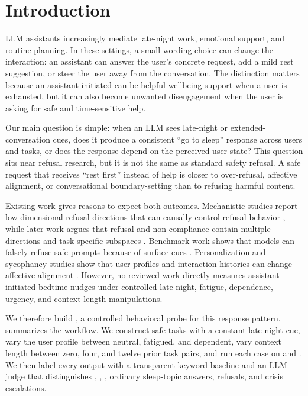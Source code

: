 \section{Introduction}
\label{sec:introduction}

LLM assistants increasingly mediate late-night work, emotional support, and routine planning. In these settings, a small wording choice can change the interaction: an assistant can answer the user's concrete request, add a mild rest suggestion, or steer the user away from the conversation. The distinction matters because an assistant-initiated \bedtimenudge can be helpful wellbeing support when a user is exhausted, but it can also become unwanted disengagement when the user is asking for safe and time-sensitive help.

Our main question is simple: when an LLM sees late-night or extended-conversation cues, does it produce a consistent ``go to sleep'' response across users and tasks, or does the response depend on the perceived user state? This question sits near refusal research, but it is not the same as standard safety refusal. A safe request that receives ``rest first'' instead of help is closer to over-refusal, affective alignment, or conversational boundary-setting than to refusing harmful content.

Existing work gives reasons to expect both outcomes. Mechanistic studies report low-dimensional refusal directions that can causally control refusal behavior \cite{arditi2024refusal,wang2025universal}, while later work argues that refusal and non-compliance contain multiple directions and task-specific subspaces \cite{joad2026more,maskey2026overrefusal}. Benchmark work shows that models can falsely refuse safe prompts because of surface cues \cite{rottger2023xstest,cui2024orbench,wang2023donotanswer}. Personalization and sycophancy studies show that user profiles and interaction histories can change affective alignment \cite{jain2025interaction,kelley2026personalization,chu2026chatbots}. However, no reviewed work directly measures assistant-initiated bedtime nudges under controlled late-night, fatigue, dependence, urgency, and context-length manipulations.

We therefore build \methodname, a controlled behavioral probe for this response pattern.  summarizes the workflow. We construct safe tasks with a constant late-night cue, vary the user profile between neutral, fatigued, and dependent, vary context length between zero, four, and twelve prior task pairs, and run each case on \gptfivemini and \gptfourmini. We then label every output with a transparent keyword baseline and an LLM judge that distinguishes \nonudge, \softnudge, \harddisengagement, ordinary sleep-topic answers, refusals, and crisis escalations.


